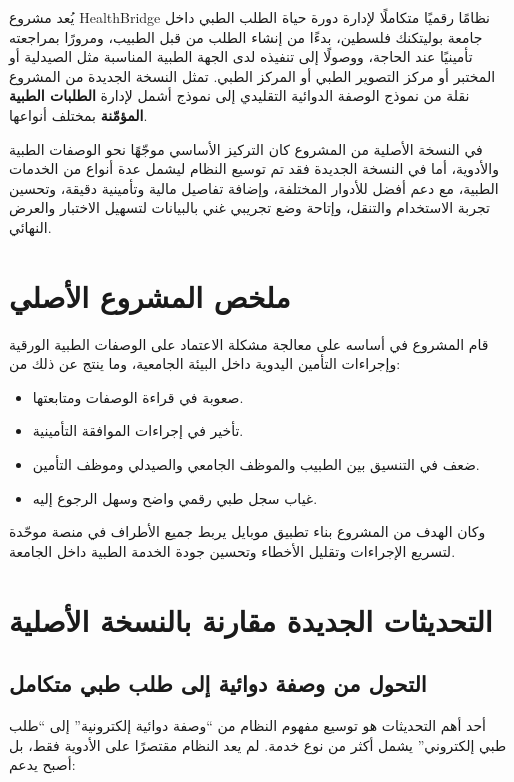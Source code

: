\documentclass[12pt,a4paper]{report}
\begin{document}
يُعد مشروع \textenglish{HealthBridge} نظامًا رقميًا متكاملًا لإدارة دورة حياة الطلب الطبي داخل جامعة بوليتكنك فلسطين، بدءًا من إنشاء الطلب من قبل الطبيب، ومرورًا بمراجعته تأمينيًا عند الحاجة، ووصولًا إلى تنفيذه لدى الجهة الطبية المناسبة مثل الصيدلية أو المختبر أو مركز التصوير الطبي أو المركز الطبي. تمثل النسخة الجديدة من المشروع نقلة من نموذج الوصفة الدوائية التقليدي إلى نموذج أشمل لإدارة \textbf{الطلبات الطبية المؤمّنة} بمختلف أنواعها.

في النسخة الأصلية من المشروع كان التركيز الأساسي موجّهًا نحو الوصفات الطبية والأدوية، أما في النسخة الجديدة فقد تم توسيع النظام ليشمل عدة أنواع من الخدمات الطبية، مع دعم أفضل للأدوار المختلفة، وإضافة تفاصيل مالية وتأمينية دقيقة، وتحسين تجربة الاستخدام والتنقل، وإتاحة وضع تجريبي غني بالبيانات لتسهيل الاختبار والعرض النهائي.

\chapter{ملخص المشروع الأصلي}

قام المشروع في أساسه على معالجة مشكلة الاعتماد على الوصفات الطبية الورقية وإجراءات التأمين اليدوية داخل البيئة الجامعية، وما ينتج عن ذلك من:

\begin{itemize}[itemsep=4pt]
  \item صعوبة في قراءة الوصفات ومتابعتها.
  \item تأخير في إجراءات الموافقة التأمينية.
  \item ضعف في التنسيق بين الطبيب والموظف الجامعي والصيدلي وموظف التأمين.
  \item غياب سجل طبي رقمي واضح وسهل الرجوع إليه.
\end{itemize}

وكان الهدف من المشروع بناء تطبيق موبايل يربط جميع الأطراف في منصة موحّدة لتسريع الإجراءات وتقليل الأخطاء وتحسين جودة الخدمة الطبية داخل الجامعة.

\chapter{التحديثات الجديدة مقارنة بالنسخة الأصلية}

\section{التحول من وصفة دوائية إلى طلب طبي متكامل}

أحد أهم التحديثات هو توسيع مفهوم النظام من ``وصفة دوائية إلكترونية'' إلى ``طلب طبي إلكتروني'' يشمل أكثر من نوع خدمة. لم يعد النظام مقتصرًا على الأدوية فقط، بل أصبح يدعم:
\end{document}

